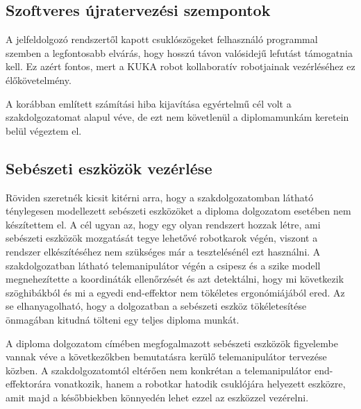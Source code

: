 \subsection{Szoftveres újratervezési szempontok}

A jelfeldolgozó rendszertől kapott csuklószögeket felhasználó programmal szemben a legfontosabb elvárás, hogy hosszú távon valósidejű lefutást támogatnia kell. Ez azért fontos, mert a KUKA robot kollaboratív robotjainak vezérléséhez ez élőkövetelmény.

A korábban említett számítási hiba kijavítása egyértelmű cél volt a szakdolgozatomat alapul véve, de ezt nem követlenül a diplomamunkám keretein belül végeztem el.

\subsection{Sebészeti eszközök vezérlése}

Röviden szeretnék kicsit kitérni arra, hogy a szakdolgozatomban látható ténylegesen modellezett sebészeti eszközöket a diploma dolgozatom esetében nem készítettem el. A cél ugyan az, hogy egy olyan rendszert hozzak létre, ami sebészeti eszközök mozgatását tegye lehetővé robotkarok végén, viszont a rendszer elkészítéséhez nem szükséges már a tesztelésénél ezt használni. A szakdolgozatban látható telemanipulátor végén a csipesz és a szike modell megnehezítette a koordináták ellenőrzését és azt detektálni, hogy mi következik szöghibákból és mi a egyedi end-effektor nem tökéletes ergonómiájából ered. Az se elhanyagolható, hogy a dolgozatban a sebészeti eszköz tökéletesítése önmagában kitudná tölteni egy teljes diploma munkát.

A diploma dolgozatom címében megfogalmazott sebészeti eszközök figyelembe vannak véve a következőkben bemutatásra kerülő telemanipulátor tervezése közben. A szakdolgozatomtól eltérően nem konkrétan a telemanipulátor end-effektorára vonatkozik, hanem a robotkar hatodik csuklójára helyezett eszközre, amit majd a későbbiekben könnyedén lehet ezzel az eszközzel vezérelni.